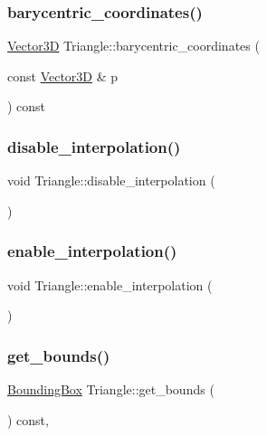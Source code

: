 \subsubsection{\texorpdfstring{barycentric\_coordinates()}{barycentric\_coordinates()}}
{\footnotesize\ttfamily \mbox{\hyperlink{classVector3D}{Vector3D}} Triangle\+::barycentric\+\_\+coordinates (\begin{DoxyParamCaption}\item[{const \mbox{\hyperlink{classVector3D}{Vector3D}} \&}]{p }\end{DoxyParamCaption}) const\hspace{0.3cm}{\ttfamily [private]}}

\mbox{\label{classTriangle_a4465d15c66b5a61bfe3441b4e0676686}} 
\subsubsection{\texorpdfstring{disable\_interpolation()}{disable\_interpolation()}}
{\footnotesize\ttfamily void Triangle\+::disable\+\_\+interpolation (\begin{DoxyParamCaption}{ }\end{DoxyParamCaption})}

\mbox{\label{classTriangle_a1a81c94f82103c8f1b81e006d8b03356}} 
\subsubsection{\texorpdfstring{enable\_interpolation()}{enable\_interpolation()}}
{\footnotesize\ttfamily void Triangle\+::enable\+\_\+interpolation (\begin{DoxyParamCaption}{ }\end{DoxyParamCaption})}

\mbox{\label{classTriangle_ac93216ac2308504ab7dd7679e6b84937}} 
\subsubsection{\texorpdfstring{get\_bounds()}{get\_bounds()}}
{\footnotesize\ttfamily \mbox{\hyperlink{classBoundingBox}{Bounding\+Box}} Triangle\+::get\+\_\+bounds (\begin{DoxyParamCaption}{ }\end{DoxyParamCaption}) const\hspace{0.3cm}{\ttfamily [override]}, {\ttfamily [virtual]}}



